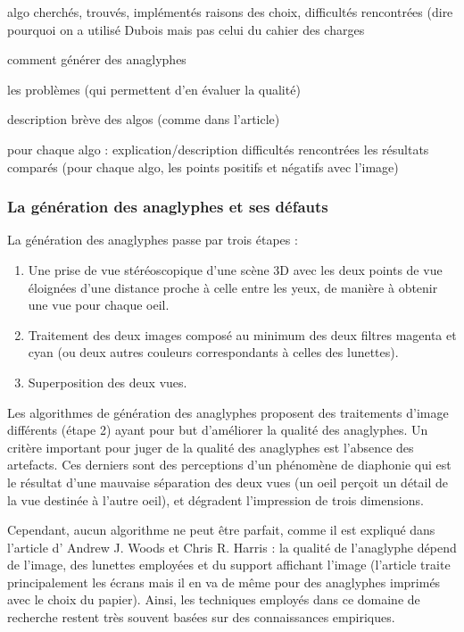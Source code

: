 algo cherchés, trouvés, implémentés
  raisons des choix, difficultés rencontrées
  (dire pourquoi on a utilisé Dubois mais pas celui du cahier des charges


comment générer des anaglyphes 

les problèmes (qui permettent d'en évaluer la qualité)

description brève des algos (comme dans l'article)

pour chaque algo : 
	explication/description
	difficultés rencontrées
 	les résultats comparés (pour chaque algo, les points positifs et négatifs avec l'image)

\subsubsection{La génération des anaglyphes et ses défauts}
La génération des anaglyphes passe par trois étapes :
	\begin{enumerate}
	\item 
		Une prise de vue stéréoscopique d'une scène 3D avec les deux points de vue éloignées d'une distance proche à celle entre les yeux, de manière à obtenir une vue pour chaque oeil.
	\item 
		Traitement des deux images composé au minimum des deux filtres magenta et cyan (ou deux autres couleurs correspondants à celles des lunettes).
	\item
		Superposition des deux vues.
	\end{enumerate}
	
	Les algorithmes de génération des anaglyphes proposent des traitements d'image différents (étape 2) ayant pour but d'améliorer la qualité des anaglyphes. Un critère important pour juger de la qualité des anaglyphes est l'absence des artefacts. Ces derniers sont des perceptions d'un phénomène de diaphonie qui est le résultat d'une mauvaise séparation des deux vues (un oeil perçoit un détail de la vue destinée à l'autre oeil), et dégradent l'impression de trois dimensions. %

	Cependant, aucun algorithme ne peut être parfait, comme il est expliqué dans l'article d' Andrew J. Woods et Chris R. Harris \cite{anaglypheDefaut}  : la qualité de l'anaglyphe dépend de l'image, des lunettes employées et du support affichant l'image (l'article traite principalement les écrans mais il en va de même pour des anaglyphes imprimés avec le choix du papier). Ainsi, les techniques employés dans ce domaine de recherche restent très souvent basées sur des connaissances empiriques.
		
